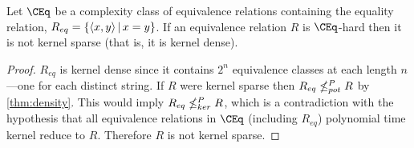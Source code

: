 \begin{corollary}
  Let $\CEq$ be a complexity class of equivalence relations containing the equality relation, $R_{eq}=\left\{\left\langle x,y\right\rangle \,\middle|\, x=y\right\}$.
  If an equivalence relation $R$ is $\CEq$-hard then it is not kernel sparse (that is, it is kernel dense).
\end{corollary}
\begin{proof}
  $R_{eq}$ is kernel dense since it contains $2^n$ equivalence classes at each length $n$---one for each distinct string.
  If $R$ were kernel sparse then $R_{eq}\nleq^{P}_{pot} R$ by \autoref{thm:density}.
  This would imply $R_{eq}\nleq^{P}_{ker} R$, which is a contradiction with the hypothesis that all equivalence relations in $\CEq$ (including $R_{eq}$) polynomial time kernel reduce to $R$.
  Therefore $R$ is not kernel sparse.
\end{proof}



